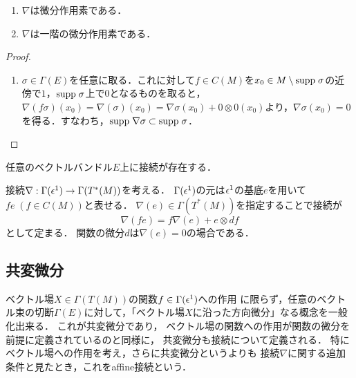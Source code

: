 \documentclass[uplatex,dvipdfmx]{jsreport}
\begin{document}
\begin{lemma}\mbox{}
    \begin{enumerate}
        \item $\nabla$は微分作用素である．
        \item $\nabla$は一階の微分作用素である．
    \end{enumerate}
\end{lemma}
\begin{proof}\mbox{}
    \begin{enumerate}
        \item $\sigma\in\Gamma(E)$を任意に取る．これに対して$f\in C(M)$を$x_0\in M\setminus\mathrm{supp}\;\sigma$の近傍で$1$，$\mathrm{supp}\;\sigma$上で$0$となるものを取ると，$\nabla(f\sigma)(x_0)=\nabla(\sigma)(x_0)=\nabla\sigma(x_0)+0\otimes 0(x_0)$より，$\nabla\sigma(x_0)=0$を得る．すなわち，$\mathrm{supp}\;\nabla\sigma\subset\mathrm{supp}\;\sigma$．
    \end{enumerate}
\end{proof}

\begin{theorem}
    任意のベクトルバンドル$E$上に接続が存在する．
\end{theorem}

\begin{example}[関数の微分は接続である]
    接続$\nabla:\Gamma(\epsilon^1)\to\Gamma(T^*(M))$を考える．
    $\Gamma(\epsilon^1)$の元は$\epsilon^1$の基底$e$を用いて$fe\;(f\in C(M))$と表せる．
    $\nabla(e)\in\Gamma(T^*(M))$を指定することで接続が
    \[\nabla(fe)=f\nabla(e)+e\otimes df\]
    として定まる．
    関数の微分$d$は$\nabla(e)=0$の場合である．
\end{example}

\subsection{共変微分}

\begin{tcolorbox}[colframe=ForestGreen, colback=ForestGreen!10!white,breakable,colbacktitle=ForestGreen!40!white,coltitle=black,fonttitle=\bfseries\sffamily,
title=]
    ベクトル場$X\in\Gamma(T(M))$の関数$f\in\Gamma(\epsilon^1)$への作用
    に限らず，任意のベクトル束の切断$\Gamma(E)$に対して，「ベクトル場$X$に沿った方向微分」なる概念を一般化出来る．
    これが共変微分であり，
    ベクトル場の関数への作用が関数の微分を前提に定義されているのと同様に，
    共変微分も接続について定義される．
    特にベクトル場への作用を考え，さらに共変微分というよりも
    接続$\nabla$に関する追加条件と見たとき，これをaffine接続という．
\end{tcolorbox}
\end{document}
